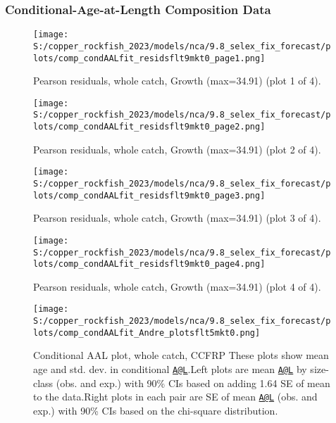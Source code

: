 \documentclass[11pt,
  english,
  letterpaper,
]{article}
\begin{document}
\hypertarget{caal-data}{%
\subsubsection{Conditional-Age-at-Length Composition Data}\label{caal-data}}

\begin{figure}
\centering
\texttt{[image: S:/copper\_rockfish\_2023/models/nca/9.8\_selex\_fix\_forecast/plots/comp\_condAALfit\_residsflt9mkt0\_page1.png]}
\caption{Pearson residuals, whole catch, Growth (max=34.91) (plot 1 of 4).\label{fig:comp_condAALfit_residsflt9mkt0_page1}}
\end{figure}

\begin{figure}
\centering
\texttt{[image: S:/copper\_rockfish\_2023/models/nca/9.8\_selex\_fix\_forecast/plots/comp\_condAALfit\_residsflt9mkt0\_page2.png]}
\caption{Pearson residuals, whole catch, Growth (max=34.91) (plot 2 of 4).\label{fig:comp_condAALfit_residsflt9mkt0_page2}}
\end{figure}

\begin{figure}
\centering
\texttt{[image: S:/copper\_rockfish\_2023/models/nca/9.8\_selex\_fix\_forecast/plots/comp\_condAALfit\_residsflt9mkt0\_page3.png]}
\caption{Pearson residuals, whole catch, Growth (max=34.91) (plot 3 of 4).\label{fig:comp_condAALfit_residsflt9mkt0_page3}}
\end{figure}

\begin{figure}
\centering
\texttt{[image: S:/copper\_rockfish\_2023/models/nca/9.8\_selex\_fix\_forecast/plots/comp\_condAALfit\_residsflt9mkt0\_page4.png]}
\caption{Pearson residuals, whole catch, Growth (max=34.91) (plot 4 of 4).\label{fig:comp_condAALfit_residsflt9mkt0_page4}}
\end{figure}

\begin{figure}
\centering
\texttt{[image: S:/copper\_rockfish\_2023/models/nca/9.8\_selex\_fix\_forecast/plots/comp\_condAALfit\_Andre\_plotsflt5mkt0.png]}
\caption{Conditional AAL plot, whole catch, CCFRP These plots show mean age and std. dev. in conditional \href{mailto:A@L}{\nolinkurl{A@L}}.Left plots are mean \href{mailto:A@L}{\nolinkurl{A@L}} by size-class (obs. and exp.) with 90\% CIs based on adding 1.64 SE of mean to the data.Right plots in each pair are SE of mean \href{mailto:A@L}{\nolinkurl{A@L}} (obs. and exp.) with 90\% CIs based on the chi-square distribution.\label{fig:comp_condAALfit_Andre_plotsflt5mkt0}}
\end{figure}
\end{document}

